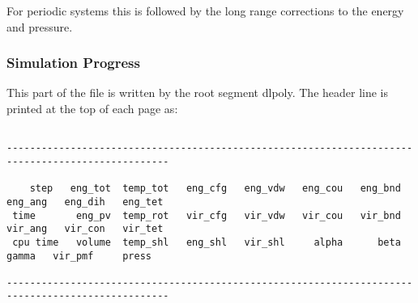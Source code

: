 For periodic systems this is followed by the long range corrections to
the energy and pressure.

\subsubsection{Simulation Progress}

 This part of the file is written by the \D{} root segment {\sc dlpoly}.
The header line is printed at the top of each page as: 

{\scriptsize\begin{verbatim}

--------------------------------------------------------------------------------------------------

    step   eng_tot  temp_tot   eng_cfg   eng_vdw   eng_cou   eng_bnd   eng_ang   eng_dih   eng_tet
 time       eng_pv  temp_rot   vir_cfg   vir_vdw   vir_cou   vir_bnd   vir_ang   vir_con   vir_tet
 cpu time   volume  temp_shl   eng_shl   vir_shl     alpha      beta   gamma   vir_pmf     press

--------------------------------------------------------------------------------------------------
\end{verbatim}}

